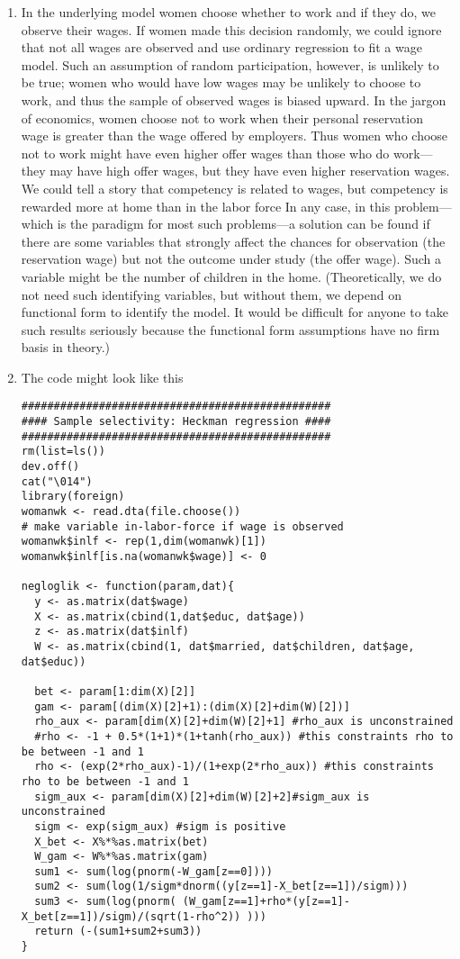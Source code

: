 \documentclass{article}
\begin{document}
\begin{solution}
\begin{enumerate}
\item In the underlying model women choose whether to work and if they do, we observe their wages. If women made this decision randomly, we could ignore that not all wages are observed and use ordinary regression to fit a wage model. Such an assumption of random participation, however, is unlikely to be true; women who would have low wages may be unlikely to choose to work, and thus the sample of observed wages is biased upward. In the jargon of economics, women choose not to work when their personal reservation wage is greater than the wage offered by employers. Thus women who choose not to work might have even higher offer wages than those who do work—they may have high offer wages, but they have even higher reservation wages. We could tell a story that competency is related to wages, but competency is rewarded more at home than in the labor force In any case, in this problem—which is the paradigm for most such problems—a solution can be found if there are some variables that strongly affect the chances for observation (the reservation wage) but not the outcome under study (the offer wage). Such a variable might be the number of children in the home. (Theoretically, we do not need such identifying variables, but without them, we depend on functional form to identify the model. It would be difficult for anyone to take such results seriously because the functional form assumptions have no firm basis in theory.)

\item The code might look like this
\begin{verbatim}
################################################
#### Sample selectivity: Heckman regression ####
################################################
rm(list=ls())
dev.off()
cat("\014")
library(foreign)
womanwk <- read.dta(file.choose())
# make variable in-labor-force if wage is observed
womanwk$inlf <- rep(1,dim(womanwk)[1])
womanwk$inlf[is.na(womanwk$wage)] <- 0

negloglik <- function(param,dat){
  y <- as.matrix(dat$wage)
  X <- as.matrix(cbind(1,dat$educ, dat$age))
  z <- as.matrix(dat$inlf)
  W <- as.matrix(cbind(1, dat$married, dat$children, dat$age, dat$educ))

  bet <- param[1:dim(X)[2]]
  gam <- param[(dim(X)[2]+1):(dim(X)[2]+dim(W)[2])]
  rho_aux <- param[dim(X)[2]+dim(W)[2]+1] #rho_aux is unconstrained
  #rho <- -1 + 0.5*(1+1)*(1+tanh(rho_aux)) #this constraints rho to be between -1 and 1
  rho <- (exp(2*rho_aux)-1)/(1+exp(2*rho_aux)) #this constraints rho to be between -1 and 1
  sigm_aux <- param[dim(X)[2]+dim(W)[2]+2]#sigm_aux is unconstrained
  sigm <- exp(sigm_aux) #sigm is positive
  X_bet <- X%*%as.matrix(bet)
  W_gam <- W%*%as.matrix(gam)
  sum1 <- sum(log(pnorm(-W_gam[z==0])))
  sum2 <- sum(log(1/sigm*dnorm((y[z==1]-X_bet[z==1])/sigm)))
  sum3 <- sum(log(pnorm( (W_gam[z==1]+rho*(y[z==1]-X_bet[z==1])/sigm)/(sqrt(1-rho^2)) )))
  return (-(sum1+sum2+sum3))
}


\end{verbatim}
\end{enumerate}
\end{solution}
\end{document}
